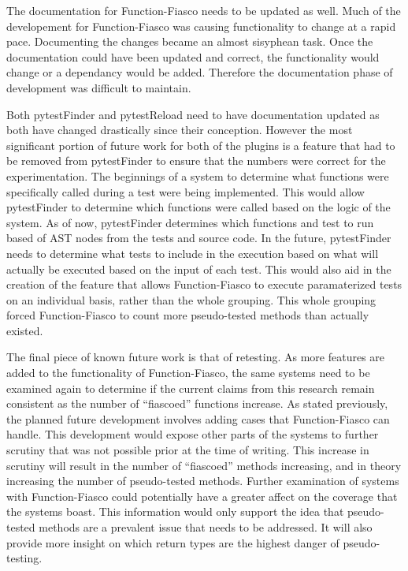   The documentation for Function-Fiasco needs to be updated as well. Much of the developement for Function-Fiasco was causing functionality to change at a rapid pace. Documenting the changes became an almost sisyphean task. Once the documentation could have been updated and correct, the functionality would change or a dependancy would be added. Therefore the documentation phase of development was difficult to maintain.

Both pytestFinder and pytestReload need to have documentation updated as both have changed drastically since their conception. However the most significant portion of future work for both of the plugins is a feature that had to be removed from pytestFinder to ensure that the numbers were correct for the experimentation. The beginnings of a system to determine what functions were specifically called during a test were being implemented. This would allow pytestFinder to determine which functions were called based on the logic of the system. As of now, pytestFinder determines which functions and test to run based of AST nodes from the tests and source code. In the future, pytestFinder needs to determine what tests to include in the execution based on what will actually be executed based on the input of each test. This would also aid in the creation of the feature that allows Function-Fiasco to execute paramaterized tests on an individual basis, rather than the whole grouping. This whole grouping forced Function-Fiasco to count more pseudo-tested methods than actually existed.

The final piece of known future work is that of retesting. As more features are added to the functionality of Function-Fiasco, the same systems need to be examined again to determine if the current claims from this research remain consistent as the number of ``fiascoed'' functions increase. As stated previously, the planned future development involves adding cases that Function-Fiasco can handle. This development would expose other parts of the systems to further scrutiny that was not possible prior at the time of writing. This increase in scrutiny will result in the number of ``fiascoed'' methods increasing, and in theory increasing the number of pseudo-tested methods. Further examination of systems with Function-Fiasco could potentially have a greater affect on the coverage that the systems boast. This information would only support the idea that pseudo-tested methods are a prevalent issue that needs to be addressed. It will also provide more insight on which return types are the highest danger of pseudo-testing.

